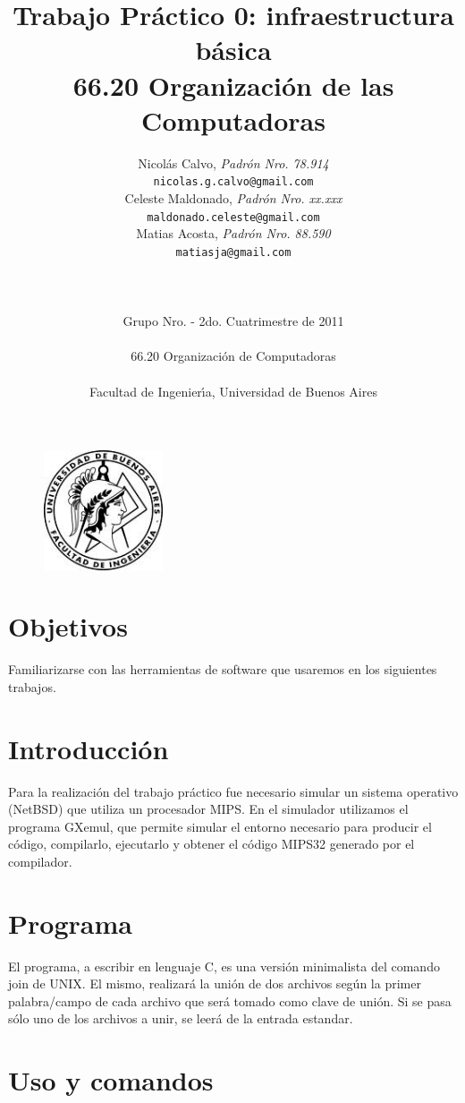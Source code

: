 \documentclass[a4paper,11pt]{article}
\title{ Trabajo Pr\'actico 0: infraestructura b\'asica   \\
        \Large{ 66.20 Organizaci\'on de las Computadoras } }
\author{Nicol\'as Calvo, \textit{Padr\'on Nro. 78.914}           	\\
            \texttt{ nicolas.g.calvo@gmail.com }      			\\
            Celeste Maldonado, \textit{Padr\'on Nro. xx.xxx}              	\\
            \texttt{ maldonado.celeste@gmail.com }                             \\
            Matias Acosta, \textit{Padr\'on Nro. 88.590}                \\
            \texttt{ matiasja@gmail.com }                     		\\
            \LARGE{}         						\\
            \LARGE{}         						\\
            \LARGE{}         						\\
            \Large{Grupo Nro.  - 2do. Cuatrimestre de 2011}         	\\
            \texttt{}         						\\
            \Large{66.20 Organizaci\'on de Computadoras}            	\\
            \texttt{}         						\\
            \Large{Facultad de Ingenier\'\i{}a, Universidad de Buenos Aires}            \\
       }
\date{}
\begin{document}
\begin{figure}
\centering
\includegraphics[width=100pt]{logofiuba.jpg}
\end{figure}


\maketitle
\thispagestyle{empty}   %

\newpage

\section{Objetivos}

Familiarizarse con las herramientas de software que usaremos en los siguientes trabajos.

\section{Introducci\'on}

Para la realizaci\'on del trabajo pr\'actico fue necesario simular un sistema operativo (NetBSD) que utiliza un procesador MIPS. En el simulador utilizamos el programa GXemul, que permite simular el entorno necesario para producir el c\'odigo, compilarlo, ejecutarlo y obtener el c\'odigo MIPS32 generado por el compilador.

\section{Programa}

El programa, a escribir en lenguaje C, es una versi\'on minimalista del comando join de UNIX. El mismo, realizar\'a la uni\'on de dos archivos seg\'un la primer palabra/campo de cada archivo que ser\'a tomado como clave de uni\'on. Si se pasa s\'olo uno de los archivos a unir, se leer\'a de la entrada estandar.

\newpage


\section{Uso y comandos}
\end{document}
